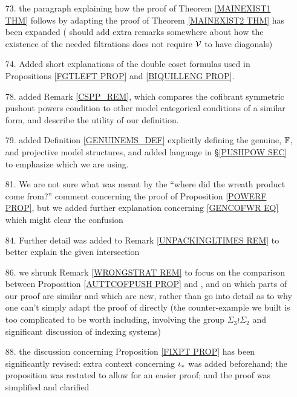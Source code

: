 \documentclass{article}
\begin{document}
\begin{itemize}
	\item[73.] the paragraph explaining how the proof of 
	Theorem \ref{MAINEXIST1 THM}
	follows by adapting the proof of 
	Theorem \ref{MAINEXIST2 THM}
	has been expanded
	({\color{red} should add extra remarks somewhere about how the existence of the needed filtrations does not require $\mathcal V$ to have diagonals})

        \item[74.] Added short explanations of the double coset formulas used in 
        Propositions \ref{FGTLEFT PROP} and \ref{BIQUILLENG PROP}.

        \item[78.] added Remark \ref{CSPP_REM}, which compares the cofibrant symmetric pushout powers condition to other model categorical conditions of a similar form, and describe the utility of our definition.

        \item[79.] added Definition \ref{GENUINEMS_DEF} explicitly defining the genuine, $\mathbb{F}$, and projective model structures,
              and added language in \S \ref{PUSHPOW SEC} to emphasize which we are using.
	
	\item[81.] We are not sure what was meant by the 
	``where did the wreath product come from?'' comment
	concerning the proof of Proposition \ref{POWERF PROP},
	but we added further explanation concerning
	\eqref{GENCOFWR EQ} which might clear the confusion
	
	\item[84.] Further detail was added 
	to Remark \ref{UNPACKINGLTIMES REM} to better explain the given intersection
	
	\item[86.] we shrunk Remark \ref{WRONGSTRAT REM} 
	to focus on the comparison between Proposition \ref{AUTTCOFPUSH PROP} and \cite[Lemma 5.9]{BM08},
	and on which parts of our proof are similar and which are new,
	rather than go into detail as to why one can't simply adapt the proof of \cite[Lemma 5.9]{BM08} directly
	(the counter-example we built 
	is too complicated to be worth including,
	involving the group 
	$\Sigma_3 \wr \Sigma_2$ and 
	significant discussion of indexing systems)	
	
	\item[88.] the discussion concerning Proposition \ref{FIXPT PROP} has been significantly revised: 
	extra context concerning $\iota_{\**}$ was added beforehand; the proposition was restated to allow for an easier proof; and the proof was simplified and clarified
	

\end{itemize}
\end{document}
